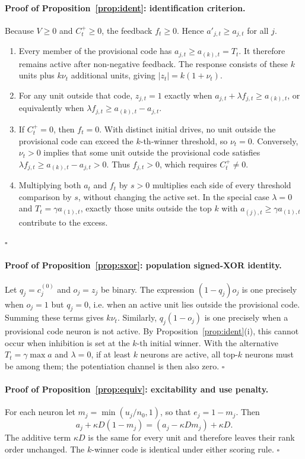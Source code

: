 \documentclass[11pt,a4paper]{article}
\begin{document}
\paragraph{Proof of Proposition~\ref{prop:ident}: identification criterion.}
Because $V\ge0$ and $C^+_t\ge0$, the feedback $f_t\ge0$. Hence $a'_{j,t}\ge a_{j,t}$ for all $j$.
\begin{enumerate}[label=(\roman*)]
\item Every member of the provisional code has $a_{j,t}\ge a_{(k),t}=T_t$. It therefore remains active after non-negative feedback. The response consists of these $k$ units plus $k\nu_t$ additional units, giving $|z_t|=k(1+\nu_t)$.
\item For any unit outside that code, $z_{j,t}=1$ exactly when $a_{j,t}+\lambda f_{j,t}\ge a_{(k),t}$, or equivalently when $\lambda f_{j,t}\ge a_{(k),t}-a_{j,t}$.
\item If $C^+_t=0$, then $f_t=0$. With distinct initial drives, no unit outside the provisional code can exceed the $k$-th-winner threshold, so $\nu_t=0$. Conversely, $\nu_t>0$ implies that some unit outside the provisional code satisfies $\lambda f_{j,t}\ge a_{(k),t}-a_{j,t}>0$. Thus $f_{j,t}>0$, which requires $C^+_t\ne0$.
\item Multiplying both $a_t$ and $f_t$ by $s>0$ multiplies each side of every threshold comparison by $s$, without changing the active set. In the special case $\lambda=0$ and $T_t=\gamma a_{(1),t}$, exactly those units outside the top $k$ with $a_{(j),t}\ge\gamma a_{(1),t}$ contribute to the excess.
\end{enumerate}
\hfill$\square$

\paragraph{Proof of Proposition~\ref{prop:sxor}: population signed-XOR identity.}
Let $q_j=c^{(0)}_j$ and $o_j=z_j$ be binary. The expression $(1-q_j)o_j$ is one precisely when $o_j=1$ but $q_j=0$, i.e. when an active unit lies outside the provisional code. Summing these terms gives $k\nu_t$. Similarly, $q_j(1-o_j)$ is one precisely when a provisional code neuron is not active. By Proposition~\ref{prop:ident}(i), this cannot occur when inhibition is set at the $k$-th initial winner. With the alternative $T_t=\gamma\max a$ and $\lambda=0$, if at least $k$ neurons are active, all top-$k$ neurons must be among them; the potentiation channel is then also zero. \hfill$\square$

\paragraph{Proof of Proposition~\ref{prop:equiv}: excitability and use penalty.}
For each neuron let $m_j=\min(u_j/n_0,1)$, so that $e_j=1-m_j$. Then
\[
a_j+\kappa D(1-m_j)=(a_j-\kappa Dm_j)+\kappa D.
\]
The additive term $\kappa D$ is the same for every unit and therefore leaves their rank order unchanged. The $k$-winner code is identical under either scoring rule. \hfill$\square$
\end{document}

